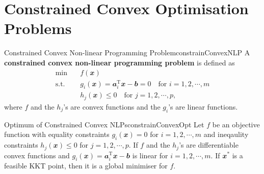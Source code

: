 \documentclass[math, code]{amznotes}
\theoremstyle{remark}
\begin{document}
\section{Constrained Convex Optimisation Problems}
\begin{dfnbox}{Constrained Convex Non-linear Programming Problem}{constrainConvexNLP}
    A {\color{red} \textbf{constrained convex non-linear programming problem}} is defined as
    \begin{align*}
        \min & \quad f(\mathbfit{x}) \\
        \mathrm{s.t.} & \quad g_i(\mathbfit{x}) = \mathbfit{a}_i^{\mathrm{T}}\mathbfit{x} - \mathbfit{b} = 0 \quad\textrm{for } i = 1, 2, \cdots, m \\
        & \quad h_j(\mathbfit{x}) \leq 0 \quad\textrm{for } j = 1, 2, \cdots, p,
    \end{align*}
    where $f$ and the $h_j$'s are convex functions and the $g_i$'s are linear functions. 
\end{dfnbox}
\begin{thmbox}{Optimum of Constrained Convex NLPs}{constrainConvexOpt}
    Let $f$ be an objective function with equality constraints $g_i(\mathbfit{x}) = 0$ for $i = 1, 2, \cdots, m$ and ineqaulity constraints $h_j(\mathbfit{x}) \leq 0$ for $j = 1, 2, \cdots, p$. If $f$ and the $h_j$'s are differentiable convex functions and $g_i(\mathbfit{x}) = \mathbfit{a}_i^{\mathrm{T}}\mathbfit{x} - \mathbfit{b}$ is linear for $i = 1, 2, \cdots, m$. If $\mathbfit{x}^*$ is a feasible KKT point, then it is a global minimiser for $f$.
\end{thmbox}
\end{document}
